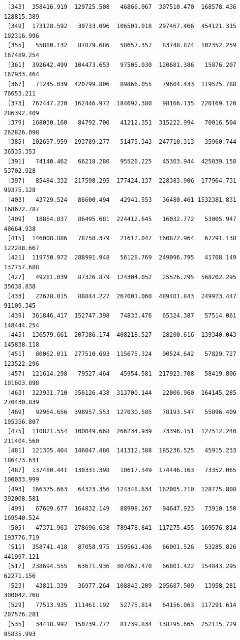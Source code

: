 \documentclass[
  letterpaper,
  DIV=11,
  numbers=noendperiod]{scrartcl}
\begin{document}
\begin{verbatim}
 [343]  358416.919  129725.508   46866.067  307510.470  168578.436  128815.389
 [349]  173128.592   30733.096  106501.018  297467.466  454121.315  102316.996
 [355]   55880.132   87879.686   58657.357   83748.874  102352.259  167489.254
 [361]  392642.499  104473.653   97505.030  120681.386   15876.207  167933.464
 [367]   71245.039  420799.806   89866.055   79604.433  119525.788   76653.211
 [373]  767447.220  162446.972  184692.380   98166.135  220169.120  286392.409
 [379]  168030.160   84792.700   41212.351  315222.994   70016.504  262826.098
 [385]  102697.959  293789.277   51475.343  247710.313   35960.744   36535.353
 [391]   74140.462   66218.280   95526.225   45303.944  425039.158   53702.928
 [397]   85484.332  217598.295  177424.137  228383.906  177964.731   99375.128
 [403]   43729.524   86600.494   42941.553   36480.461 1532381.831  168672.787
 [409]   18864.837   86495.681  224412.645   16032.772   53005.947   48664.938
 [415]  146008.886   78758.379   21612.047  160872.964   67291.138  122288.667
 [421]  119750.972  288991.948   56128.769  249096.795   41708.149  137757.688
 [427]   49281.039   87326.879  124304.052   25526.295  568202.295   35638.838
 [433]   22678.015   88844.227  267001.060  489401.843  249923.447   91109.345
 [439]  361846.417  152747.398   74833.476   65324.387   57514.061  148444.254
 [445]  136579.661  207386.174  408218.527   28200.616  139340.043  145838.118
 [451]   80062.011  277510.693  115675.324   90524.642   57829.727  123522.296
 [457]  121614.298   79527.464   45954.581  217923.708   58419.806  101603.898
 [463]  323931.710  356126.438  313700.144   22006.960  164145.285  270430.839
 [469]   92964.656  398957.553  127030.585   78193.547   55096.409  105356.807
 [475]  110821.554  100049.668  266234.939   73396.151  127512.240  211404.560
 [481]  121305.404  146047.480  141312.388  185236.525   45915.233  186473.631
 [487]  137480.441  130331.398   10617.349  174446.163   73352.065  100033.999
 [493]  166375.663   64323.356  124348.634  162005.710  128775.808  392008.581
 [499]   67609.677  164832.149   88998.267   94647.923   73910.150  169540.524
 [505]   47371.963  278696.638  789478.841  117275.455  169576.814  193776.719
 [511]  358741.418   87058.975  159561.436   66001.526   53285.826  441997.121
 [517]  238694.555   63671.936  307062.470   66801.422  154843.295   62271.156
 [523]   43811.339   36977.264  108843.209  205687.509   13958.281  300042.768
 [529]   77513.935  111461.192   52775.814   64156.063  117291.614  207576.281
 [535]   34418.992  150739.772   81739.834  138795.665  252115.729   85835.993

\end{verbatim}
\end{document}

